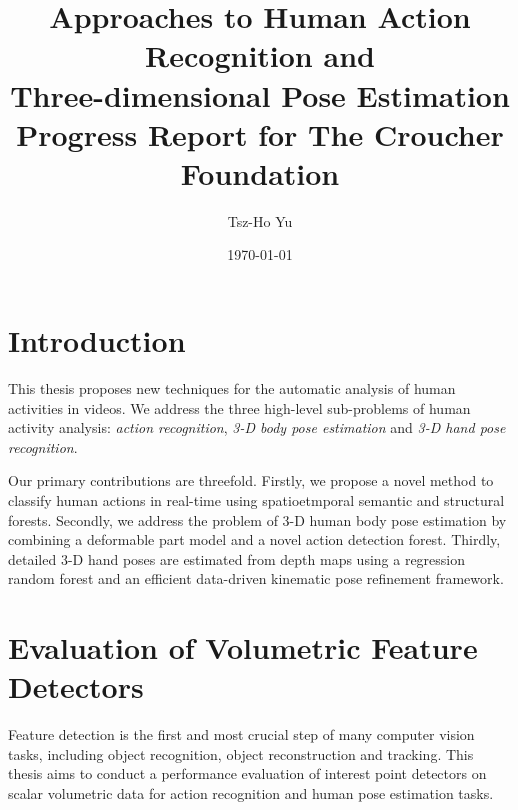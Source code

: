 \documentclass[10pt, a4paper]{article}
\title{{\Large Approaches to Human Action Recognition and \\ Three-dimensional Pose Estimation } \\ {\normalsize Progress Report for The Croucher Foundation}}
\author{Tsz-Ho Yu}
\date{\today}
\begin{document}
\maketitle 

\section{Introduction} 
 
This thesis proposes new techniques for the automatic analysis of human activities in videos. We address the three high-level sub-problems of human activity analysis: \emph{action recognition}, \emph{3-D body pose estimation} and \emph{3-D hand pose recognition}. 

Our primary contributions are threefold. Firstly, we propose a novel method to classify human actions in real-time using spatioetmporal semantic and structural forests. Secondly, we address the problem of 3-D human body pose estimation by combining a deformable part model and a novel action detection forest. Thirdly, detailed 3-D hand poses are estimated from depth maps using a regression random forest and an efficient data-driven kinematic pose refinement framework.      

\section{Evaluation of Volumetric Feature Detectors}

Feature detection is the first and most crucial step of many computer vision tasks, including object recognition, object reconstruction and tracking. This thesis aims to conduct a performance evaluation of interest point detectors on scalar volumetric data for action recognition and human pose estimation tasks. 

\end{document}

